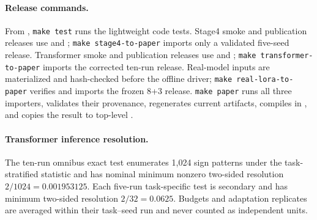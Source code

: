 \documentclass[10pt,twocolumn]{article}
\theoremstyle{definition}
\begin{document}
\paragraph{Release commands.}
From , \texttt{make test} runs the lightweight code tests.  Stage4 smoke and publication releases use  and ; \texttt{make stage4-to-paper} imports only a validated five-seed release.  Transformer smoke and publication releases use  and ; \texttt{make transformer-to-paper} imports the corrected ten-run release.  Real-model inputs are materialized and hash-checked before the offline  driver; \texttt{make real-lora-to-paper} verifies and imports the frozen 8+3 release.  \texttt{make paper} runs all three importers, validates their provenance, regenerates current artifacts, compiles in , and copies the result to top-level .

\paragraph{Transformer inference resolution.}
The ten-run omnibus exact test enumerates 1,024 sign patterns under the task-stratified statistic and has nominal minimum nonzero two-sided resolution $2/1024=0.001953125$.  Each five-run task-specific test is secondary and has minimum two-sided resolution $2/32=0.0625$.  Budgets and adaptation replicates are averaged within their task--seed run and never counted as independent units.

\FloatBarrier
\end{document}
